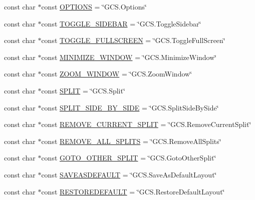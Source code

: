 \begin{DoxyCompactItemize}
\item 
const char $\ast$const \hyperlink{group___core_plugin_ga267bcce339e88888bc0201263e9bbdfb}{O\-P\-T\-I\-O\-N\-S} = \char`\"{}G\-C\-S.\-Options\char`\"{}
\item 
const char $\ast$const \hyperlink{group___core_plugin_ga5666d7d0dd9fe17d3391329dce26f2ae}{T\-O\-G\-G\-L\-E\-\_\-\-S\-I\-D\-E\-B\-A\-R} = \char`\"{}G\-C\-S.\-Toggle\-Sidebar\char`\"{}
\item 
const char $\ast$const \hyperlink{group___core_plugin_gaf42c8b03a52e53fbdc3a6f8c014230e8}{T\-O\-G\-G\-L\-E\-\_\-\-F\-U\-L\-L\-S\-C\-R\-E\-E\-N} = \char`\"{}G\-C\-S.\-Toggle\-Full\-Screen\char`\"{}
\item 
const char $\ast$const \hyperlink{group___core_plugin_ga1bec24c27ebb317beb5bd728f2695a32}{M\-I\-N\-I\-M\-I\-Z\-E\-\_\-\-W\-I\-N\-D\-O\-W} = \char`\"{}G\-C\-S.\-Minimize\-Window\char`\"{}
\item 
const char $\ast$const \hyperlink{group___core_plugin_gac48fb1ea972baf7b49dd3cc7f7306abe}{Z\-O\-O\-M\-\_\-\-W\-I\-N\-D\-O\-W} = \char`\"{}G\-C\-S.\-Zoom\-Window\char`\"{}
\item 
const char $\ast$const \hyperlink{group___core_plugin_gac606ab3edf11d3377855b39076879af2}{S\-P\-L\-I\-T} = \char`\"{}G\-C\-S.\-Split\char`\"{}
\item 
const char $\ast$const \hyperlink{group___core_plugin_gabececa23956bc46634779f4abbb9bad9}{S\-P\-L\-I\-T\-\_\-\-S\-I\-D\-E\-\_\-\-B\-Y\-\_\-\-S\-I\-D\-E} = \char`\"{}G\-C\-S.\-Split\-Side\-By\-Side\char`\"{}
\item 
const char $\ast$const \hyperlink{group___core_plugin_ga333ed74b9c4600e73641e017ff527e10}{R\-E\-M\-O\-V\-E\-\_\-\-C\-U\-R\-R\-E\-N\-T\-\_\-\-S\-P\-L\-I\-T} = \char`\"{}G\-C\-S.\-Remove\-Current\-Split\char`\"{}
\item 
const char $\ast$const \hyperlink{group___core_plugin_ga88a3d0898a8b11873092cedcbac1d981}{R\-E\-M\-O\-V\-E\-\_\-\-A\-L\-L\-\_\-\-S\-P\-L\-I\-T\-S} = \char`\"{}G\-C\-S.\-Remove\-All\-Splits\char`\"{}
\item 
const char $\ast$const \hyperlink{group___core_plugin_ga615e7fc83cead9cfc1d43aa8b748a688}{G\-O\-T\-O\-\_\-\-O\-T\-H\-E\-R\-\_\-\-S\-P\-L\-I\-T} = \char`\"{}G\-C\-S.\-Goto\-Other\-Split\char`\"{}
\item 
const char $\ast$const \hyperlink{group___core_plugin_gae5ad60fb00f57b64928e1751953d23f7}{S\-A\-V\-E\-A\-S\-D\-E\-F\-A\-U\-L\-T} = \char`\"{}G\-C\-S.\-Save\-As\-Default\-Layout\char`\"{}
\item 
const char $\ast$const \hyperlink{group___core_plugin_ga82855cb11aeb074c7d22740cd36453ea}{R\-E\-S\-T\-O\-R\-E\-D\-E\-F\-A\-U\-L\-T} = \char`\"{}G\-C\-S.\-Restore\-Default\-Layout\char`\"{}

\end{DoxyCompactItemize}
